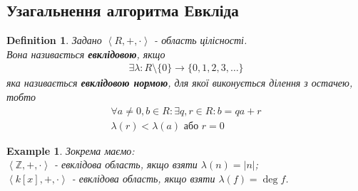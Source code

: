 \documentclass[a4paper, 14pt]{extarticle}
\theoremstyle{theoremdd}
\theoremstyle{theoremdd}
\newtheorem{definition}[theorem]{Definition}
\theoremstyle{theoremdd}
\theoremstyle{theoremdd}
\newtheorem{example}[theorem]{Example}
\theoremstyle{theoremdd}
\theoremstyle{theoremdd}
\theoremstyle{theoremdd}
\theoremstyle{theoremdd}
\begin{document}
\subsection{Узагальнення алгоритма Евкліда}
\begin{definition}
Задано $\left<R,+,\cdot \right>$ - область цілісності.\\
Вона називається \textbf{евклідовою}, якщо
\begin{align*}
\exists \lambda: R \setminus \{0\} \to \{0,1,2,3,\dots\}
\end{align*}
яка називається \textbf{евклідовою нормою}, для якої виконується ділення з остачею, тобто
\begin{align*}
\forall a \neq 0,b \in R: \exists q,r \in R: b = qa + r \\
\lambda(r) < \lambda(a) \text{ або } r = 0
\end{align*}
\end{definition}

\begin{example}
Зокрема маємо:\\
$\left<\mathbb{Z},+,\cdot \right>$ - евклідова область, якщо взяти $\lambda(n) = |n|$;\\
$\left< k[x],+,\cdot \right>$ - евклідова область, якщо взяти $\lambda(f) = \deg f$.
\end{example}
\end{document}
